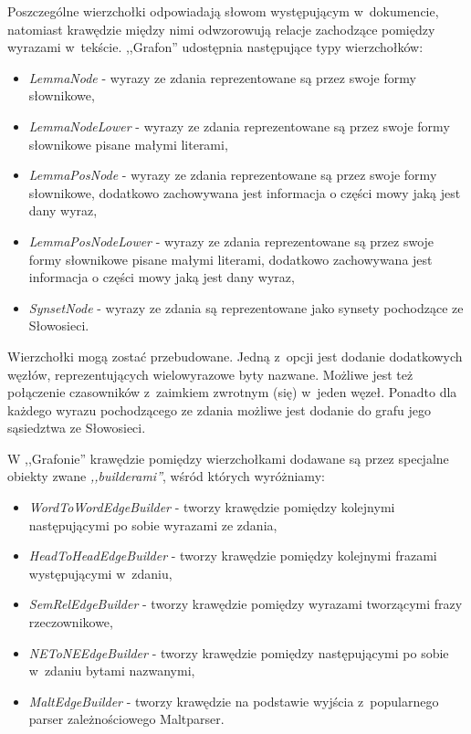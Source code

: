 \documentclass[a4paper, twoside, openright, 12pt]{report}
\begin{document}
        Poszczególne wierzchołki odpowiadają słowom występującym w~dokumencie, natomiast krawędzie między nimi
        odwzorowują relacje zachodzące pomiędzy wyrazami w~tekście. ,,Grafon'' udostępnia następujące typy wierzchołków:
        \begin{itemize}
            \item \emph{LemmaNode} - wyrazy ze zdania reprezentowane są przez swoje formy słownikowe,
            \item \emph{LemmaNodeLower} - wyrazy ze zdania reprezentowane są przez swoje formy słownikowe pisane małymi literami,
            \item \emph{LemmaPosNode} - wyrazy ze zdania reprezentowane są przez swoje formy słownikowe, dodatkowo zachowywana
                jest informacja o części mowy jaką jest dany wyraz,
            \item \emph{LemmaPosNodeLower} - wyrazy ze zdania reprezentowane są przez swoje formy słownikowe pisane małymi
                literami, dodatkowo zachowywana jest informacja o części mowy jaką jest dany wyraz,
            \item \emph{SynsetNode} - wyrazy ze zdania są reprezentowane jako synsety pochodzące ze Słowosieci.
        \end{itemize}

        Wierzchołki mogą zostać przebudowane. Jedną z~opcji jest dodanie dodatkowych węzłów, reprezentujących wielowyrazowe
        byty nazwane. Możliwe jest też połączenie czasowników z~zaimkiem zwrotnym (się) w~jeden węzeł. Ponadto dla każdego
        wyrazu pochodzącego ze zdania możliwe jest dodanie do grafu jego sąsiedztwa ze Słowosieci.

        W ,,Grafonie'' krawędzie pomiędzy wierzchołkami dodawane są przez specjalne obiekty zwane \emph{,,builderami''},
        wśród których wyróżniamy:
        \begin{itemize}
            \item \emph{WordToWordEdgeBuilder} - tworzy krawędzie pomiędzy kolejnymi następującymi po sobie wyrazami ze
                zdania,
            \item \emph{HeadToHeadEdgeBuilder} - tworzy krawędzie pomiędzy kolejnymi frazami występującymi w~zdaniu,
            \item \emph{SemRelEdgeBuilder} - tworzy krawędzie pomiędzy wyrazami tworzącymi frazy rzeczownikowe,
            \item \emph{NEToNEEdgeBuilder} - tworzy krawędzie pomiędzy następującymi po sobie w~zdaniu bytami nazwanymi,
            \item \emph{MaltEdgeBuilder} - tworzy krawędzie na podstawie wyjścia z~popularnego parser zależnościowego Maltparser.
        \end{itemize}
\end{document}
